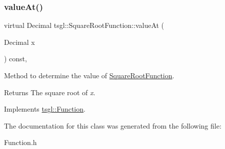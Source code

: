 \subsubsection{\texorpdfstring{value\+At()}{valueAt()}}
{\footnotesize\ttfamily virtual Decimal tsgl\+::\+Square\+Root\+Function\+::value\+At (\begin{DoxyParamCaption}\item[{Decimal}]{x }\end{DoxyParamCaption}) const\hspace{0.3cm}{\ttfamily [inline]}, {\ttfamily [virtual]}}



Method to determine the value of \hyperlink{classtsgl_1_1_square_root_function}{Square\+Root\+Function}. 

\begin{DoxyReturn}{Returns}
The square root of {\itshape x}. 
\end{DoxyReturn}


Implements \hyperlink{classtsgl_1_1_function_affb7b3b19a04efefa29a9870d666e912}{tsgl\+::\+Function}.



The documentation for this class was generated from the following file\+:\begin{DoxyCompactItemize}
\item 
Function.\+h\end{DoxyCompactItemize}
